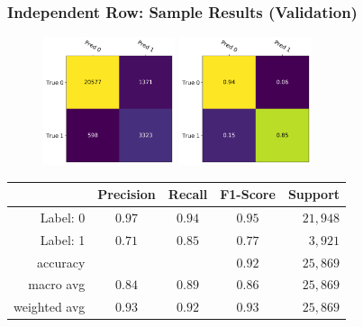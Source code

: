 \documentclass[usenames,dvipsnames]{beamer}
\begin{document}
\begin{frame}
  \frametitle{Independent Row: Sample Results (Validation)}
  \begin{figure}
    \centering
    \includegraphics[height=3.75cm, valign=c]{assets/ind_cm_test}
    \includegraphics[height=3.75cm, valign=c]{assets/ind_cm_norm_test}
  \end{figure}
  \begin{center}
    \begin{tabular}{rcccr}
    \toprule
    {} &  Precision &  Recall &  F1-Score & Support \\
    \midrule
    Label: 0 & $0.97$ & $0.94$ & $0.95$ & $21,948$ \\
    Label: 1 & $0.71$ & $0.85$ & $0.77$ & $3,921$ \\
    \midrule
    accuracy & {} & {} & $0.92$ & $25,869$ \\
    macro avg & $0.84$ & $0.89$ & $0.86$ & $25,869$ \\
    weighted avg & $0.93$ & $0.92$ & $0.93$ & $25,869$ \\
    \bottomrule
    \end{tabular}
  \end{center}
\end{frame}
\end{document}
